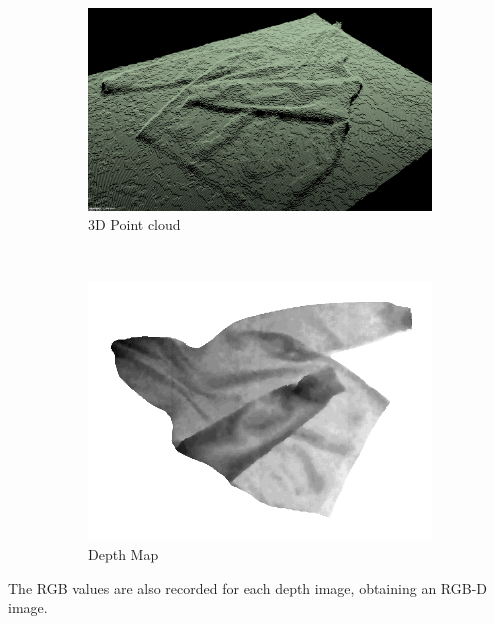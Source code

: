 \begin{figure}[htbp]
	\centering
    \begin{subfigure}[l]{0.74\textwidth}
	    \centering
    	\includegraphics[width=\textwidth]
    	{figures/point-cloud-01.png}
    	\caption{3D Point cloud}
	\end{subfigure}
	~
    \begin{subfigure}[r]{0.64\textwidth}
	    \centering
    	\includegraphics[width=\textwidth]
    	{figures/point-cloud-projection.png}
    	\caption{Depth Map}
	\end{subfigure}
    \caption{}
    \label{fig:point_cloud_and_depth_image}
\end{figure}

The RGB values are also recorded for each depth image, obtaining an RGB-D image.

